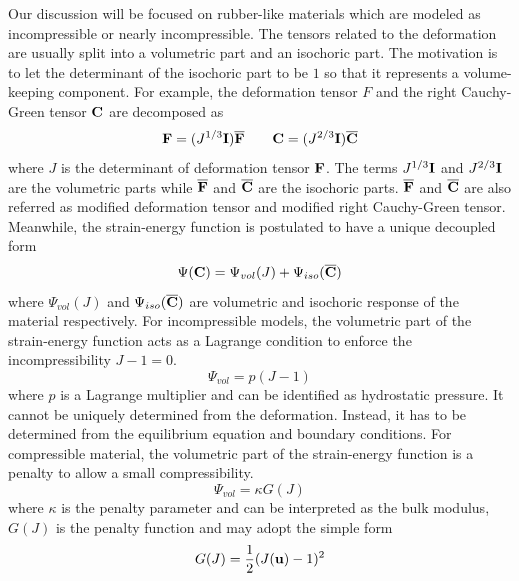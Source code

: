 Our discussion will be focused on rubber-like materials which are modeled as incompressible or nearly incompressible. The tensors related to the deformation are usually split into a volumetric part and an isochoric part. The motivation is to let the determinant of the isochoric part to be $1$ so that it represents a volume-keeping component. For example, the deformation tensor $F$ and the right Cauchy-Green tensor $\bold{C}$ are decomposed as
\begin{equation} \label{split1}
\bold{F} = (J^{1/3}\bold{I})\overline{\bold{F}}
\qquad
\bold{C} = (J^{2/3}\bold{I})\overline{\bold{C}}
\end{equation}
where $J$ is the determinant of deformation tensor $\bold{F}$. The terms $J^{1/3}\bold{I}$ and $J^{2/3}\bold{I}$ are the volumetric parts while $\overline{\bold{F}}$ and $\overline{\bold{C}}$ are the isochoric parts. $\overline{\bold{F}}$ and $\overline{\bold{C}}$ are also referred as modified deformation tensor and modified right Cauchy-Green tensor. Meanwhile, the strain-energy function is postulated to have a unique decoupled form
\begin{equation} \label{split2}
\Psi(\bold{C}) = \Psi_{vol}(J) + \Psi_{iso}(\overline{\bold{C}})
\end{equation}
where $\Psi_{vol}(J)$ and $\Psi_{iso}(\overline{\bold{C}})$ are volumetric and isochoric response of the material respectively. For incompressible models, the volumetric part of the strain-energy function acts as a Lagrange condition to enforce the incompressibility $J -1 = 0$.
\begin{equation} \label{Lagrange}
\Psi_{vol} = p(J-1)
\end{equation} 
where $p$ is a Lagrange multiplier and can be identified as hydrostatic pressure. It cannot be uniquely determined from the deformation. Instead, it has to be determined from the equilibrium equation and boundary conditions. For compressible material, the volumetric part of the strain-energy function is a penalty to allow a small compressibility.
\begin{equation} \label{penalty}
\Psi_{vol} = \kappa{G(J)}
\end{equation}
where $\kappa$ is the penalty parameter and can be interpreted as the bulk modulus, $G(J)$ is the penalty function and may adopt the simple form
\begin{equation} \label{penalty2}
G(J) = \frac{1}{2}(J(\bold{u}) - 1 )^2
\end{equation}

%
